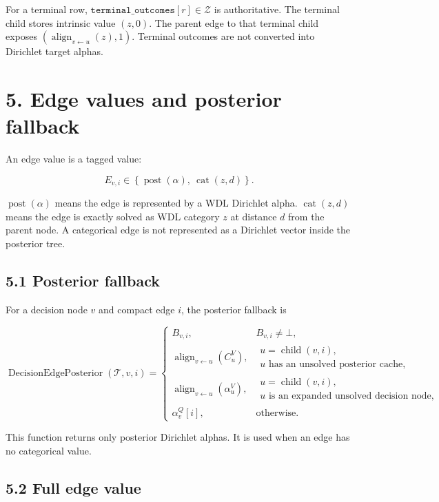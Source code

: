 \documentclass[11pt]{article}
\newcommand{\Tree}{\mathcal{T}}
\newcommand{\Z}{\mathcal{Z}}
\newcommand{\Align}{\operatorname{align}}
\newcommand{\Child}{\operatorname{child}}
\newcommand{\Cat}{\operatorname{cat}}
\newcommand{\Posterior}{\operatorname{post}}
\newcommand{\DecisionEdgePosterior}{\operatorname{DecisionEdgePosterior}}
\begin{document}
For a terminal row, \(\texttt{terminal\_outcomes}[r]\in\Z\) is authoritative.
The terminal child stores intrinsic value \((z,0)\). The parent edge to that
terminal child exposes \((\Align_{v\leftarrow u}(z),1)\). Terminal outcomes are
not converted into Dirichlet target alphas.

\section*{5. Edge values and posterior fallback}

An edge value is a tagged value:

\[
E_{v,i}\in
\left\{
\Posterior(\alpha),\ \Cat(z,d)
\right\}.
\]

\(\Posterior(\alpha)\) means the edge is represented by a WDL Dirichlet alpha.
\(\Cat(z,d)\) means the edge is exactly solved as WDL category \(z\) at distance
\(d\) from the parent node. A categorical edge is not represented as a Dirichlet
vector inside the posterior tree.

\subsection*{5.1 Posterior fallback}

For a decision node \(v\) and compact edge \(i\), the posterior fallback is

\[
\DecisionEdgePosterior(\Tree,v,i)=
\begin{cases}
B_{v,i},&B_{v,i}\ne\bot,\\[2pt]
\Align_{v\leftarrow u}(C^V_u),
&\begin{array}{l}
u=\Child(v,i),\\
u\text{ has an unsolved posterior cache},
\end{array}\\[8pt]
\Align_{v\leftarrow u}(\alpha_u^V),
&\begin{array}{l}
u=\Child(v,i),\\
u\text{ is an expanded unsolved decision node},
\end{array}\\[8pt]
\alpha_v^Q[i],&\text{otherwise}.
\end{cases}
\]

This function returns only posterior Dirichlet alphas. It is used when an edge
has no categorical value.

\subsection*{5.2 Full edge value}
\end{document}
